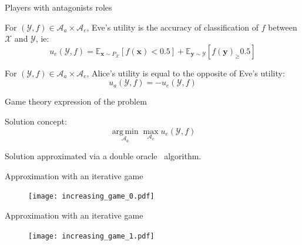 \documentclass[10pt,aspectratio=169]{beamer}
\DeclareMathOperator*{\argmin}{arg\,min} %
\begin{document}
\begin{frame}{Players with antagonists roles}

    \begin{tcolorbox}[colback=lightgreen,colframe=greentheme,title=\textbf{Definition} (Eve's utility)]
        For $(\mathcal{Y}, f)  \in \mathcal{A}_a \times \mathcal{A}_e$, Eve's utility is the accuracy of classification of $f$ between $\mathcal{X}$ and $\mathcal{Y}$, ie:
            \begin{equation}
                u_e(\mathcal{Y}, f) = \mathbb{E}_{\mathbf{x}\sim P_{\mathcal{X}}}[f(\mathbf{x}) < 0.5] + \mathbb{E}_{\mathbf{y} \sim \mathcal{Y}}[f(\mathbf{y})_ \geq 0.5]
            \end{equation}
    \end{tcolorbox}

    \pause
    \begin{tcolorbox}[colback=lightgreen,colframe=greentheme,title=\textbf{Definition} (Alice's utility)]
        For $(\mathcal{Y}, f)  \in \mathcal{A}_a \times \mathcal{A}_e$, Alice's utility is equal to the opposite of Eve's utility:
            \begin{equation}
                u_a(\mathcal{Y}, f) = - u_e(\mathcal{Y}, f)
            \end{equation}
    \end{tcolorbox}

\end{frame}


\begin{frame}{Game theory expression of the problem}

    Solution concept:
    \alert{
        \Large{
            \begin{equation*}
            \underset{\mathcal{A}_a}{\argmin} \max_{\mathcal{A}_e} u_e(\mathcal{Y}, f)
            \end{equation*}
        }
    }

    \pause
    Solution approximated via a \alert{double oracle}~ algorithm.
    
\end{frame}

    
\begin{frame}{Approximation with an iterative game}
    \begin{figure}
        \texttt{[image: increasing\_game\_0.pdf]}
    \end{figure}
\end{frame}

\begin{frame}{Approximation with an iterative game}
    \begin{figure}
        \texttt{[image: increasing\_game\_1.pdf]}
    \end{figure}
\end{frame}
\end{document}
